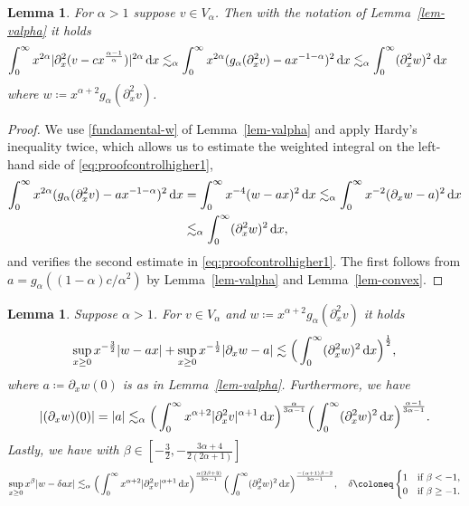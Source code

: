 \documentclass[reqno,12pt]{amsart}
\renewcommand{\d}{\ensuremath{\mathrm{d}}}
\renewcommand{\d}{\ensuremath{{\rm d}}}
\newtheorem{lemma}[theorem]{Lemma}
\numberwithin{equation}{section}
\begin{document}
%
\begin{lemma}\label{lem:controlhigher}
%
For $\alpha >1$ suppose $v \in V_\alpha$. Then with the notation of Lemma~\ref{lem-valpha} it holds
%
 \begin{align}
\int_0^\infty x^{2\alpha} |\partial_x^2 (v -c x^{\frac{\alpha-1}{\alpha}})|^{2\alpha} \, \d x \lesssim_\alpha \int_0^\infty x^{2\alpha} (g_\alpha(\partial_x^2 v) - a x^{-1-\alpha})^2 \, \d x
&\lesssim_{\alpha} \int_0^\infty (\partial_x^2 w)^2 \, \d x \,  \label{eq:proofcontrolhigher1}
\end{align}
%
where $w \coloneq x^{\alpha+2} g_\alpha(\partial_x^2 v)$.
\end{lemma}
%
\begin{proof}
%
We use \eqref{fundamental-w} of Lemma~\ref{lem-valpha} and apply Hardy’s inequality twice, which allows us to estimate the weighted integral on the left-hand side of \eqref{eq:proofcontrolhigher1},
%
\begin{align}
\int_0^\infty x^{2\alpha} (g_\alpha(\partial_x^2 v) - a x^{-1-\alpha})^2 \, \d x &= \int_0^\infty x^{-4} (w - ax)^2 \, \d x \lesssim_{\alpha} \int_0^\infty x^{-2} (\partial_x w - a)^2 \, \d x \nonumber\\
&\lesssim_{\alpha} \int_0^\infty (\partial_x^2 w)^2 \, \d x, \label{eq:proofcontrolhigher1-alt}
\end{align}
%
and verifies the second estimate in \eqref{eq:proofcontrolhigher1}. The first follows from $a = g_\alpha((1-\alpha) c/\alpha^2)$ by Lemma~\ref{lem-valpha} and Lemma~\ref{lem-convex}.
\end{proof}
%

%
\begin{lemma}\label{lem-sup-wx}
Suppose $\alpha > 1$. For $v \in V_\alpha$ and $w \coloneq x^{\alpha+2} g_\alpha(\partial_x^2 v)$ it holds
%
\begin{equation}\label{sup-wx}
\sup_{x \ge 0} x^{-\frac 3 2} |w - a x| + \sup_{x \ge 0} x^{-\frac 1 2} |\partial_x w - a| \lesssim \Big(\int_0^\infty (\partial_x^2 w)^2 \, \d x\Big)^{\frac 1 2},
\end{equation}
%
where $a \coloneq \partial_x w(0)$ is as in Lemma~\ref{lem-valpha}. Furthermore, we have
%
\begin{equation}\label{est-coeff-a}
|(\partial_x w)(0)| = |a| \lesssim_\alpha \Big(\int_0^\infty x^{\alpha+2} |\partial_x^2 v|^{\alpha+1} \, \d x\Big)^{\frac{\alpha}{3\alpha-1}} \Big(\int_0^\infty (\partial_x^2 w)^2 \, \d x\Big)^{\frac{\alpha-1}{3\alpha-1}}.
\end{equation}
%
Lastly, we have with $\beta \in [- \frac 3 2, -\frac{3\alpha+4}{2(2\alpha+1)}]$
%
\begin{align}\label{sup-w-alt}
\sup_{x \ge 0} x^{\beta} |w - \delta a x| \lesssim_\alpha \Big(\int_0^\infty x^{\alpha+2} |\partial_x^2 v|^{\alpha+1} \, \d x\Big)^{\frac{\alpha (2\beta+3)}{3\alpha-1}} \Big(\int_0^\infty (\partial_x^2 w)^2 \, \d x\Big)^{\frac{- (\alpha+1) \beta - 2}{3\alpha-1}}, \quad \delta \coloneq \begin{cases} 1 & \text{if } \beta < - 1, \\ 0 & \text{if } \beta \ge -1. 
\end{cases}
\end{align} 
%
\end{lemma}
%
\end{document}
